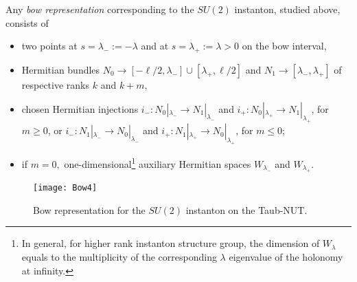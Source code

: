 \documentclass[12pt]{article}
\theoremstyle{definition}
\theoremstyle{remark}
\numberwithin{theorem}{section}
\begin{document}
Any {\em bow representation} \cite{Cherkis:2010bn} corresponding to the $SU(2)$ instanton, studied above, consists of 
\begin{itemize}
\item
two points at $s=\lambda_-:=-\lambda$ and at $s=\lambda_+:=\lambda>0$ on the bow interval, 
\item 
Hermitian bundles $N_0\rightarrow[-\ell/2,\lambda_-]\cup[\lambda_+,\ell/2]$ and $N_1\rightarrow[\lambda_-,\lambda_+]$ of respective ranks $k$ and $k+m,$
\item
chosen Hermitian injections $i_-: N_0|_{\lambda_-}\rightarrow N_1|_{\lambda_-}$ and $i_+: N_0|_{\lambda_+}\rightarrow N_1|_{\lambda_+}$, for $m\geq 0$, or $i_-: N_1|_{\lambda_-}\rightarrow N_0|_{\lambda_-}$ and $i_+: N_1|_{\lambda_+}\rightarrow N_0|_{\lambda_+}$, for $m\leq 0$;
\item
if $m=0,$ one-dimensional\footnote{In general, for higher rank instanton structure group, the dimension of $W_\lambda$ equals to the multiplicity of the corresponding $\lambda$ eigenvalue of the holonomy at infinity.} auxiliary Hermitian spaces $W_{\lambda_-}$ and $W_{\lambda_+}$.
\end{itemize}
\begin{figure}[htb]
\begin{center}
    \texttt{[image: Bow4]}
\caption{Bow representation for the $SU(2)$ instanton on the Taub-NUT.}
\label{Fig:Bow}
\end{center}
\end{figure}
\end{document}
